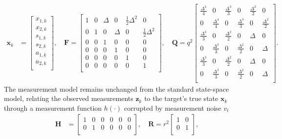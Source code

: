 \begin{align}
    \mathbf{x}_k &=
    \begin{bmatrix}
        x_{1,k} \\
        x_{2,k} \\
        s_{1,k} \\
        s_{2,k} \\
        a_{1,k} \\
        a_{2,k} \\
    \end{bmatrix},
    \quad \mathbf{F} =
    \begin{bmatrix}
        1 & 0 & \Delta & 0 & \frac{1}{2}\Delta^2 & 0\\
        0 & 1 & 0 & \Delta & 0 & \frac{1}{2}\Delta^2\\
        0 & 0 & 1 & 0 & 0 & 0\\
        0 & 0 & 0 & 1 & 0 & 0\\
        0 & 0 & 0 & 0 & 1 & 0\\
        0 & 0 & 0 & 0 & 0 & 1\\
    \end{bmatrix},
    \quad \mathbf{Q} = q^2
    \begin{bmatrix}
        \frac{\Delta^4}{4} & 0 & \frac{\Delta^3}{3} & 0 & \frac{\Delta^2}{2} & 0\\
        0 & \frac{\Delta^4}{4} & 0 & \frac{\Delta^3}{3} & 0 & \frac{\Delta^2}{2}\\
        \frac{\Delta^3}{3} & 0 & \frac{\Delta^2}{2} & 0 & \Delta & 0\\
        0 & \frac{\Delta^3}{3} & 0 & \frac{\Delta^2}{2} & 0 & \Delta \\
        \frac{\Delta^3}{3} & 0 & \frac{\Delta^2}{2} & 0 & \Delta & 0\\
        0 & \frac{\Delta^3}{3} & 0 & \frac{\Delta^2}{2} & 0 & \Delta \\
    \end{bmatrix}.
\end{align}
The measurement model remains unchanged from the standard state-space model, relating the observed measurements $\mathbf{z}_k$ to the target's true state $\mathbf{x}_k$ through a measurement function $h(\cdot)$ corrupted by measurement noise $v_t$
\begin{align}
    \mathbf{H} &=
    \begin{bmatrix}
        1 & 0 & 0 & 0 & 0 & 0 \\
        0 & 1 & 0 & 0 & 0 & 0 \\
    \end{bmatrix},
    \quad \mathbf{R} = r^2
    \begin{bmatrix}
        1 & 0  \\
        0 & 1  \\
    \end{bmatrix},
\end{align}
